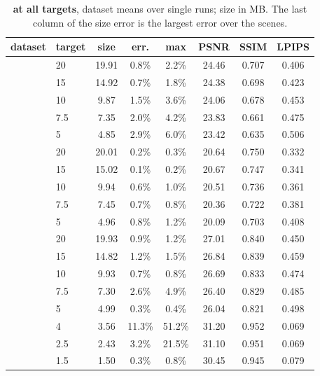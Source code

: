 \begin{table}[h]\centering\footnotesize
\caption{\textbf{\BM at all targets}, dataset means over single runs; size in MB. The last column of the size error is the largest error over the scenes.}
\label{sup:tab:targets}
\setlength{\tabcolsep}{3pt}
\begin{tabular}{@{}llcccccc@{}}
\toprule
dataset & target & size & err. & max & PSNR & SSIM & LPIPS \\
\midrule
{} & 20 & 19.91 & 0.8\% & 2.2\% & 24.46 & 0.707 & 0.406 \\
 & 15 & 14.92 & 0.7\% & 1.8\% & 24.38 & 0.698 & 0.423 \\
 & 10 & 9.87 & 1.5\% & 3.6\% & 24.06 & 0.678 & 0.453 \\
 & 7.5 & 7.35 & 2.0\% & 4.2\% & 23.83 & 0.661 & 0.475 \\
 & 5 & 4.85 & 2.9\% & 6.0\% & 23.42 & 0.635 & 0.506 \\
\midrule
{} & 20 & 20.01 & 0.2\% & 0.3\% & 20.64 & 0.750 & 0.332 \\
 & 15 & 15.02 & 0.1\% & 0.2\% & 20.67 & 0.747 & 0.341 \\
 & 10 & 9.94 & 0.6\% & 1.0\% & 20.51 & 0.736 & 0.361 \\
 & 7.5 & 7.45 & 0.7\% & 0.8\% & 20.36 & 0.722 & 0.381 \\
 & 5 & 4.96 & 0.8\% & 1.2\% & 20.09 & 0.703 & 0.408 \\
\midrule
{} & 20 & 19.93 & 0.9\% & 1.2\% & 27.01 & 0.840 & 0.450 \\
 & 15 & 14.82 & 1.2\% & 1.5\% & 26.84 & 0.839 & 0.459 \\
 & 10 & 9.93 & 0.7\% & 0.8\% & 26.69 & 0.833 & 0.474 \\
 & 7.5 & 7.30 & 2.6\% & 4.9\% & 26.40 & 0.829 & 0.485 \\
 & 5 & 4.99 & 0.3\% & 0.4\% & 26.04 & 0.821 & 0.498 \\
\midrule
{} & 4 & 3.56 & 11.3\% & 51.2\% & 31.20 & 0.952 & 0.069 \\
 & 2.5 & 2.43 & 3.2\% & 21.5\% & 31.10 & 0.951 & 0.069 \\
 & 1.5 & 1.50 & 0.3\% & 0.8\% & 30.45 & 0.945 & 0.079 \\
\bottomrule
\end{tabular}
\end{table}

